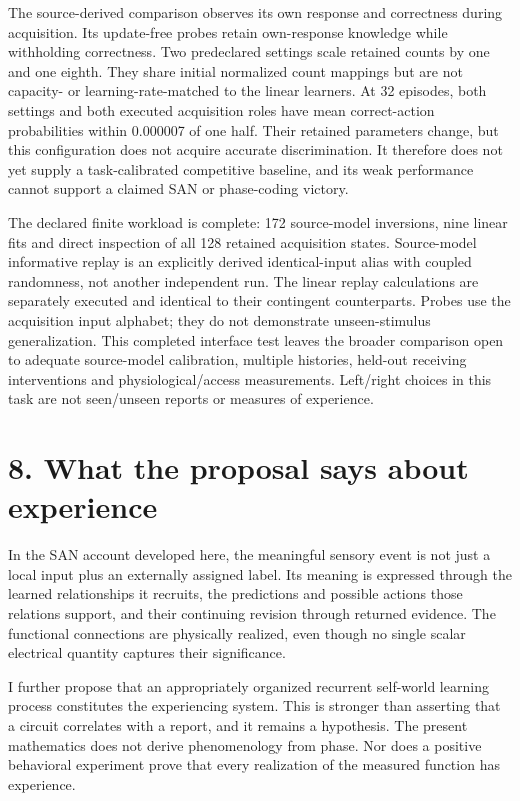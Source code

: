 \documentclass[
  american,
  11pt,
  letterpaper,
]{article}
\begin{document}
The source-derived comparison observes its own response and correctness during acquisition. Its update-free probes retain own-response knowledge while withholding correctness. Two predeclared settings scale retained counts by one and one eighth. They share initial normalized count mappings but are not capacity- or learning-rate-matched to the linear learners. At 32 episodes, both settings and both executed acquisition roles have mean correct-action probabilities within 0.000007 of one half. Their retained parameters change, but this configuration does not acquire accurate discrimination. It therefore does not yet supply a task-calibrated competitive baseline, and its weak performance cannot support a claimed SAN or phase-coding victory.

The declared finite workload is complete: 172 source-model inversions, nine linear fits and direct inspection of all 128 retained acquisition states. Source-model informative replay is an explicitly derived identical-input alias with coupled randomness, not another independent run. The linear replay calculations are separately executed and identical to their contingent counterparts. Probes use the acquisition input alphabet; they do not demonstrate unseen-stimulus generalization. This completed interface test leaves the broader comparison open to adequate source-model calibration, multiple histories, held-out receiving interventions and physiological/access measurements. Left/right choices in this task are not seen/unseen reports or measures of experience.

\section{8. What the proposal says about experience}\label{what-the-proposal-says-about-experience}

In the SAN account developed here, the meaningful sensory event is not just a local input plus an externally assigned label. Its meaning is expressed through the learned relationships it recruits, the predictions and possible actions those relations support, and their continuing revision through returned evidence. The functional connections are physically realized, even though no single scalar electrical quantity captures their significance.

I further propose that an appropriately organized recurrent self-world learning process constitutes the experiencing system. This is stronger than asserting that a circuit correlates with a report, and it remains a hypothesis. The present mathematics does not derive phenomenology from phase. Nor does a positive behavioral experiment prove that every realization of the measured function has experience.
\end{document}
